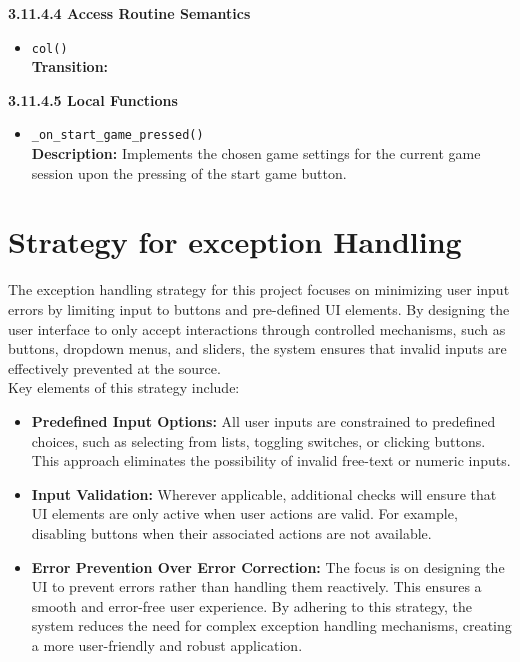 \documentclass[12pt, titlepage]{article}
\begin{document}
\textbf{3.11.4.4 Access Routine Semantics}
\begin{itemize}

	\item \texttt{col()}\\
	\textbf{Transition:} 

\end{itemize}

\textbf{3.11.4.5 Local Functions}
\begin{itemize}
    \item \texttt{\_on\_start\_game\_pressed() }\\
	\textbf{Description:} Implements the chosen game settings for the current game session upon the pressing of the start game button. 

	 
	
	
\end{itemize}

\newpage

\section{Strategy for exception Handling} 

The exception handling strategy for this project focuses on minimizing user input errors by limiting input to buttons and pre-defined UI elements. By designing the user interface to only accept interactions through controlled mechanisms, such as buttons, dropdown menus, and sliders, the system ensures that invalid inputs are effectively prevented at the source.\\

Key elements of this strategy include:

\begin{itemize}
    \item \textbf{Predefined Input Options: }All user inputs are constrained to predefined choices, such as selecting from lists, toggling switches, or clicking buttons. This approach eliminates the possibility of invalid free-text or numeric inputs.
    \item \textbf{Input Validation: }Wherever applicable, additional checks will ensure that UI elements are only active when user actions are valid. For example, disabling buttons when their associated actions are not available.
    \item \textbf{Error Prevention Over Error Correction: }The focus is on designing the UI to prevent errors rather than handling them reactively. This ensures a smooth and error-free user experience.
By adhering to this strategy, the system reduces the need for complex exception handling mechanisms, creating a more user-friendly and robust application.

\end{itemize}
\end{document}
